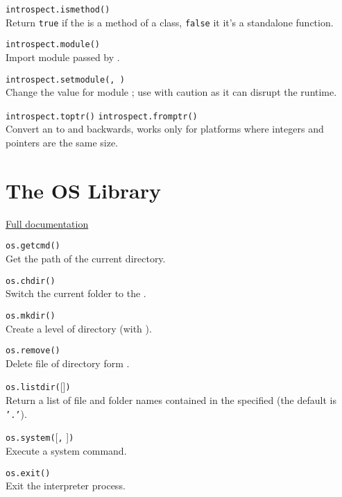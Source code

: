 \hangpar \texttt{introspect.ismethod(}\texttt{)} \\
Return \texttt{true} if the  is a method of a class, \texttt{false} it it's a standalone function.

\hangpar \texttt{introspect.module(}\texttt{)} \\
Import module passed by .

\hangpar \texttt{introspect.setmodule(}\texttt{, }\texttt{)} \\
Change the value for module ; use with caution as it can disrupt the runtime.

\hangpar \texttt{introspect.toptr(}\texttt{)}  \texttt{introspect.fromptr(}\texttt{)} \\
Convert an  to  and backwards, works only for platforms where integers and pointers are the same size.

\section*{The OS Library}

\hangpar \href{https://github.com/berry-lang/berry/wiki/Chapter-7\#module-os}{Full documentation}

\hangpar \texttt{os.getcmd()} \\
Get the path of the current directory.

\hangpar \texttt{os.chdir(}\texttt{)} \\
Switch the current folder to the .

\hangpar \texttt{os.mkdir(}\texttt{)} \\
Create a level of directory (with ).

\hangpar \texttt{os.remove(}\texttt{)} \\
Delete file of directory form .

\hangpar \texttt{os.listdir(}[]\texttt{)} \\
Return a list of file and folder names contained in the specified  (the default is \texttt{'.'}).

\hangpar \texttt{os.system(}[\texttt{,} ]\texttt{)} \\
Execute a system command.

\hangpar \texttt{os.exit()}\\
Exit the interpreter process.

